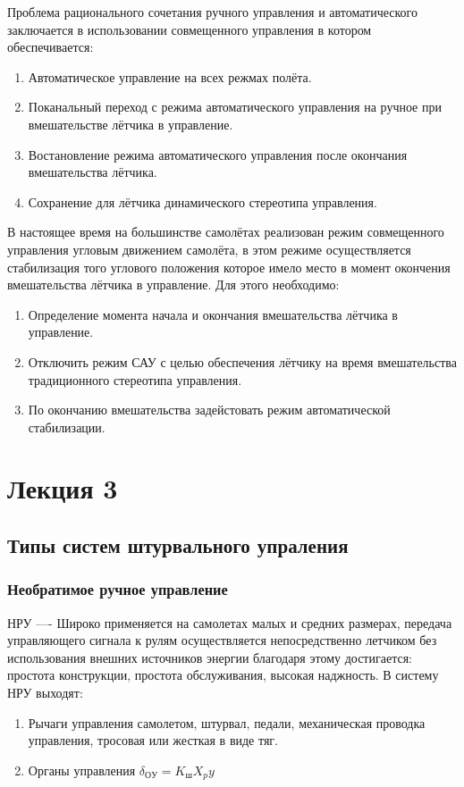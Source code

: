 \documentclass{article}
\begin{document}
Проблема рационального сочетания ручного управления и автоматического заключается в использовании совмещенного управления в котором обеспечивается: 
\begin{enumerate}
\item Автоматическое управление на всех режмах полёта.
\item Поканальный переход с режима автоматического управления на ручное при вмешательстве лётчика в управление.
\item Востановление режима автоматического управления после окончания вмешательства лётчика.
\item Сохранение для лётчика динамического стереотипа управления.
\end{enumerate}
В настоящее время на большинстве самолётах реализован режим совмещенного управления угловым движением самолёта, в этом режиме осуществляется стабилизация того углового положения которое имело место в момент окончения вмешательства лётчика в управление. 
Для этого необходимо:
\begin{enumerate}
\item Определение момента начала и окончания вмешательства лётчика в управление.
\item Отключить режим САУ с целью обеспечения лётчику на время вмешательства традиционного стереотипа управления.
\item По окончанию вмешательства задейстовать режим автоматической стабилизации.  
\end{enumerate}
\newpage

\section{Лекция 3} 
\subsection{Типы систем штурвального упраления}
\subsubsection{Необратимое ручное управление}
НРУ —- Широко применяется на самолетах малых и средних размерах, передача управляющего сигнала к рулям осуществляется непосредственно летчиком без использования внешних источников энергии благодаря этому достигается: простота конструкции, простота обслуживания, высокая наджность. 
В систему НРУ выходят:
\begin{enumerate}
\item Рычаги управления самолетом, штурвал, педали, механическая проводка управления, тросовая или жесткая в виде тяг.
\item Органы управления $\delta_{ОУ} = K_ш X_py$
\end{enumerate}
\end{document}
